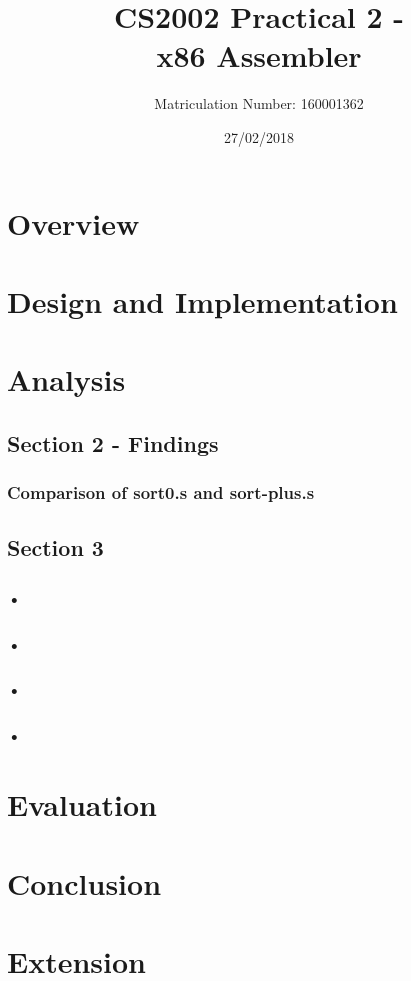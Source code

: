 \documentclass[11]{article}
\title{CS2002 Practical 2 - \\x86 Assembler}
\date{27/02/2018}
\author{Matriculation Number: 160001362}
\begin{document}
	\maketitle
	\newpage
	\tableofcontents
	
	\newpage
	\section{Overview}
	\section{Design and Implementation}
	\section{Analysis}
		\subsection{Section 2 - Findings}
			\subsubsection{Comparison of sort0.s and sort-plus.s}
		\subsection{Section 3}
			\subsubsection{•}
			\subsubsection{•}
			\subsubsection{•}
			\subsubsection{•}
	\section{Evaluation}
	\section{Conclusion}
	\section{Extension}
\end{document}
